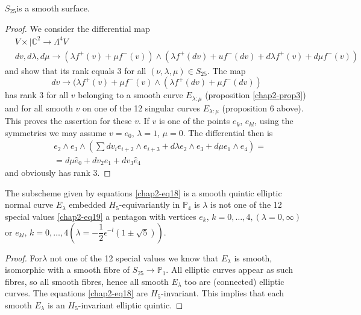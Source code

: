 \begin{lemma}\label{chap2-lem4}
$S_{25}$\pageoriginale is a smooth surface.
\end{lemma}

\begin{proof}
We consider the differential map
{\fontsize{10pt}{12pt}\selectfont
\begin{align*}
& V\times |\mathbb{C}^{2}\to \Lambda^{4}V\\
& dv, d\lambda,d\mu\to (\lambda f^{+}(v)+\mu f^{-}(v))\wedge (\lambda
f^{+}(dv)+uf^{-}(dv)+d\lambda f^{+}(v)+d\mu f^{-}(v))
\end{align*}}
and show that its rank equals 3 for all $(\nu,\lambda,\mu)\in
S_{25}$. The map
$$
dv\to (\lambda f^{+}(v)+\mu f^{-}(v)\wedge (\lambda f^{+}(dv)+\mu f^{-}(dv))
$$
has rank 3 for all $v$ belonging to a smooth curve $E_{\lambda:\mu}$
(proposition \ref{chap2-prop3}) and for all smooth $v$ on one of the
12 singular curves $E_{\lambda:\mu}$ (proposition 6 above). This
proves the assertion for these $v$. If $v$ is one of the points
$e_{k}$, $e_{kl}$, using the symmetries we may assume $v=e_{0}$,
$\lambda=1$, $\mu=0$. The differential then is
\begin{align*}
& e_{2}\wedge e_{3}\wedge (\sum dv_{i}e_{i+2}\wedge e_{i+3}+d\lambda
e_{2}\wedge e_{3}+d\mu e_{1}\wedge e_{4})=\\
&=d\mu \widehat{e}_{0}+dv_{2}e_{1}+dv_{3}\widehat{e}_{4}
\end{align*}
and obviously has rank 3.
\end{proof}

\begin{theorem}\label{chap2-thm1}
The subscheme given by equations \eqref{chap2-eq18} is a smooth
quintic elliptic normal curve $E_{\lambda}$ embedded
$H_{5}$-equivariantly in $\mathbb{P}_{4}$ is $\lambda$ is not one of the
12 special values \eqref{chap2-eq19} a pentagon with vertices $e_{k}$,
$k=0,\ldots,4,(\lambda=0,\infty)$ or $e_{kl}$,
$k=0,\ldots,4(\lambda=-\dfrac{1}{2}\epsilon^{-l}(1\pm \sqrt{5}))$. 
\end{theorem}

\begin{proof}
For\pageoriginale $\lambda$ not one of the 12 special values we know
that $E_{\lambda}$ is smooth, isomorphic with a smooth fibre of
$S_{25}\to \mathbb{P}_{1}$. All elliptic curves appear as such fibres,
so all smooth fibres, hence all smooth $E_{\lambda}$ too are
(connected) elliptic curves. The equations \eqref{chap2-eq18} are
$H_{5}$-invariant. This implies that each smooth $E_{\lambda}$ is an
$H_{5}$-invariant elliptic quintic.
\end{proof}

